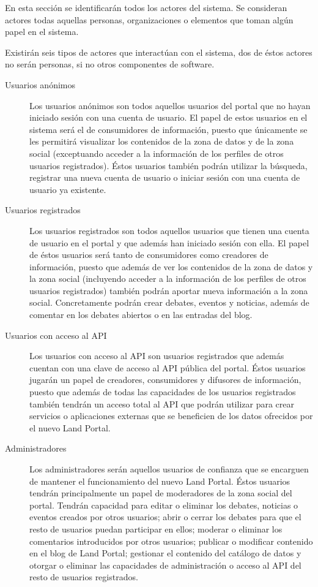 En esta sección se identificarán todos los actores del sistema.  Se consideran actores todas aquellas personas, organizaciones o elementos que toman algún papel en el sistema.

Existirán seis tipos de actores que interactúan con el sistema, dos de éstos actores no serán personas, si no otros componentes de software.
\begin{description}
\item[Usuarios anónimos]  Los usuarios anónimos son todos aquellos usuarios del portal que no hayan iniciado sesión con una cuenta de usuario.  El papel de estos usuarios en el sistema será el de consumidores de información, puesto que únicamente se les permitirá visualizar los contenidos de la zona de datos y de la zona social (exceptuando acceder a la información de los perfiles de otros usuarios registrados).  Éstos usuarios también podrán utilizar la búsqueda, registrar una nueva cuenta de usuario o iniciar sesión con una cuenta de usuario ya existente.
\item[Usuarios registrados]  Los usuarios registrados son todos aquellos usuarios que tienen una cuenta de usuario en el portal y que además han iniciado sesión con ella.  El papel de éstos usuarios será tanto de consumidores como creadores de información, puesto que además de ver los contenidos de la zona de datos y la zona social (incluyendo acceder a la información de los perfiles de otros usuarios registrados) también podrán aportar nueva información a la zona social.  Concretamente podrán crear debates, eventos y noticias, además de comentar en los debates abiertos o en las entradas del blog.
\item[Usuarios con acceso al API]  Los usuarios con acceso al API son usuarios registrados que además cuentan con una clave de acceso al API pública del portal.  Éstos usuarios jugarán un papel de creadores, consumidores y difusores de información, puesto que además de todas las capacidades de los usuarios registrados también tendrán un acceso total al API que podrán utilizar para crear servicios o aplicaciones externas que se beneficien de los datos ofrecidos por el nuevo Land Portal.
\item[Administradores]  Los administradores serán aquellos usuarios de confianza que se encarguen de mantener el funcionamiento del nuevo Land Portal.  Éstos usuarios tendrán principalmente un papel de moderadores de la zona social del portal.  Tendrán capacidad para editar o eliminar los debates, noticias o eventos creados por otros usuarios; abrir o cerrar los debates para que el resto de usuarios puedan participar en ellos; moderar o eliminar los comentarios introducidos por otros usuarios; publicar o modificar contenido en el blog de Land Portal; gestionar el contenido del catálogo de datos y otorgar o eliminar las capacidades de administración o acceso al API del resto de usuarios registrados.

\end{description}
